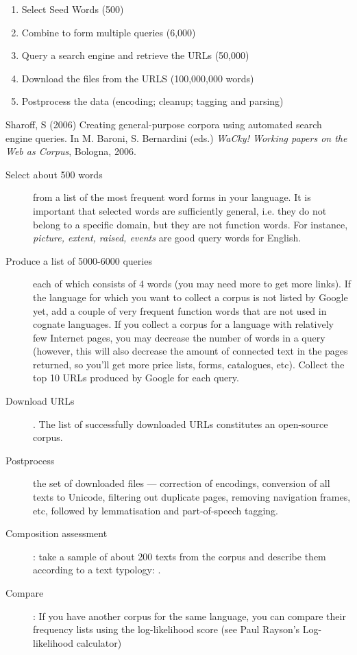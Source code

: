 \documentclass[a4paper,landscape,headrule,footrule,xetex]{foils}
\begin{document}

\begin{enumerate}
\item Select Seed Words (500)
\item Combine to form multiple queries (6,000)
\item Query a search engine and retrieve the URLs (50,000)
\item Download the files from the URLS (100,000,000 words)
\item Postprocess the data (encoding; cleanup; tagging and parsing)
\end{enumerate}

Sharoff, S (2006) Creating general-purpose corpora using automated search engine queries. In M. Baroni, S. Bernardini (eds.) \textit{WaCky! Working papers on the Web as Corpus}, Bologna, 2006.


 
 \begin{description}
 \item [Select about 500 words] from a list of the most frequent word
   forms in your language. It is important that selected words are
   sufficiently general, i.e. they do not belong to a specific domain,
   but they are not function words. For instance, \textit{picture,
     extent, raised, events} are good query words for English.
 \item [Produce a list of 5000-6000 queries] each of which consists of
   4 words (you may need more to get more links). If the language for
   which you want to collect a corpus is not listed by Google yet, add
   a couple of very frequent function words that are not used in
   cognate languages. If you collect a corpus for a language with
   relatively few Internet pages, you may decrease the number of words
   in a query (however, this will also decrease the amount of
   connected text in the pages returned, so you'll get more price
   lists, forms, catalogues, etc). Collect the top 10 URLs produced by
   Google for each query.

 \item [Download URLs]. The list of successfully
   downloaded URLs constitutes an open-source corpus.  

 \item [Postprocess] the set of downloaded files --- correction of
   encodings, conversion of all texts to Unicode, filtering out
   duplicate pages, removing navigation frames, etc, followed by
   lemmatisation and part-of-speech tagging.
 \item [Composition assessment]: take a sample of about 200 texts from
   the corpus and describe them according to a text typology:
.
 \item [Compare]: If you have another corpus for the same
   language, you can compare their frequency lists using the
   log-likelihood score (see Paul Rayson's Log-likelihood calculator)
 \end{description}
\end{document}
